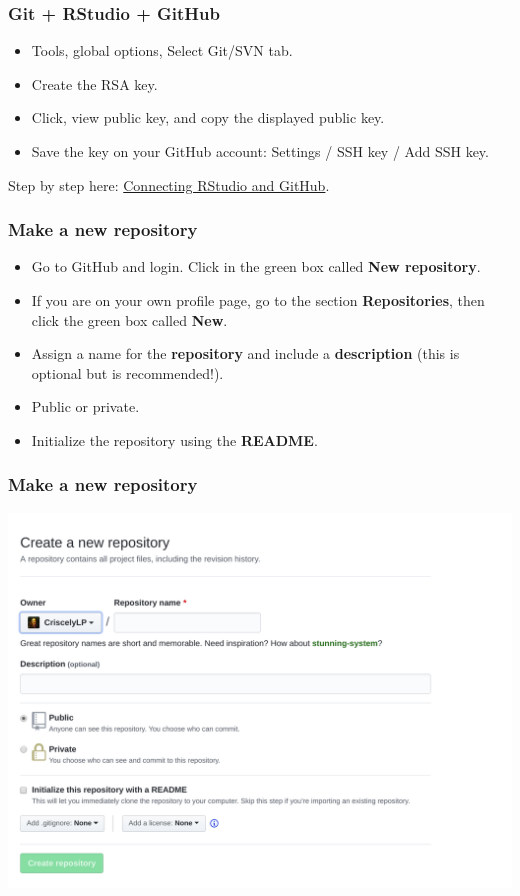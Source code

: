 \documentclass{beamer}
\begin{document}
\begin{frame}
\frametitle{Git + RStudio + GitHub}

\begin{itemize}
    \item Tools, global options, Select Git/SVN tab.
    \item Create the RSA key.
    \item Click, view public key, and copy the displayed public key.
    \item Save the key on your GitHub account: Settings / SSH key / Add SSH key.
\end{itemize}

Step by step here: \href{https://www.r-bloggers.com/rstudio-and-github/}{\faStar Connecting RStudio and GitHub}.

\end{frame}


\begin{frame}
\frametitle{Make a new repository}

\begin{itemize}
    \item Go to GitHub and login. Click in the green box called \textbf{New repository}. 
    \item If you are on your own profile page, go to the section \textbf{Repositories}, then click the green box called \textbf{New}.
    \item Assign a name for the \textbf{repository} and include a \textbf{description} (this is optional but is recommended!).
    \item Public or private.
    \item Initialize the repository using the \textbf{README}.
\end{itemize}
\end{frame}

\begin{frame}[fragile]
\frametitle{Make a new repository}
\begin{center}
\includegraphics[scale=0.27]{img/github_makeRepo.png}
\end{center}
\end{frame}
\end{document}
